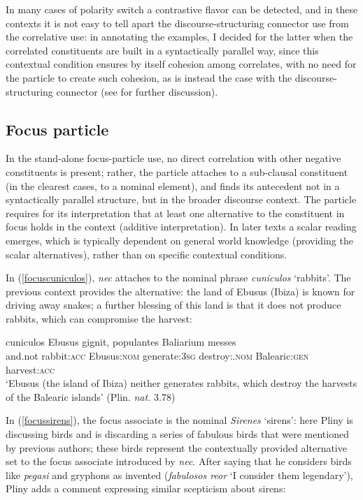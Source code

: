 \documentclass[output=paper,modfonts,nonflat,citecolor=brown,
showindex
]{langsci/langscibook}
\begin{document}
In many cases of polarity switch a contrastive flavor can be detected, and in these contexts it is not easy to tell apart the discourse-structuring connector use from the correlative use: in annotating the examples, I decided for the latter when the correlated constituents are built in a syntactically parallel way, since this contextual condition ensures by itself cohesion among correlates, with no need for the particle to create such cohesion, as is instead the case with the discourse-structuring connector (see \citealt[]{OrlandiniPoccetti07} for further discussion).

\subsection{Focus particle} \label{functionfocusparticle}

In the stand-alone focus-particle use, no direct correlation with other negative constituents is present; rather, the particle attaches to a sub-clausal constituent (in the clearest cases, to a nominal element), and finds its antecedent not in a syntactically parallel structure, but in the broader discourse context. The particle requires for its interpretation that at least one alternative to the constituent in focus holds in the context (additive interpretation). In later texts a scalar reading emerges, which is typically dependent on general world knowledge (providing the scalar alternatives), rather than on specific contextual conditions.

In (\ref{focuscuniculos}), {\emph{nec}} attaches to the nominal phrase {\emph{cuniculos}} `rabbits'. The previous context provides the alternative: the land of Ebusus (Ibiza) is known for driving away snakes; a further blessing of this land is that it does not produce rabbits, which can compromise the harvest:

{\begin{exe}
\ex \label{focuscuniculos}  cuniculos Ebusus gignit, populantes Baliarium messes\\
and.not rabbit:{\textsc{acc}} Ebusus:{\textsc{nom}} generate:{\textsc{3sg}} destroy:{\ptcp}.{\textsc{nom}} Balearic:{\textsc{gen}} harvest:{\textsc{acc}}\\

`Ebusus (the island of Ibiza) neither generates rabbits, which destroy the harvests of the Balearic islands' (Plin. {\emph{nat.}} 3.78)
\end{exe}}

\noindent In (\ref{focussirens}), the focus associate is the nominal {\emph{Sirenes}} `sirens': here Pliny is discussing birds and is discarding a series of fabulous birds that were mentioned by previous authors; these birds represent the contextually provided alternative set to the focus associate introduced by {\emph{nec}}. After saying that he considers birds like {\emph{pegasi}} and gryphons as invented ({\emph{fabulosos reor}} `I consider them legendary'), Pliny adds a comment expressing similar scepticism about sirens:
\end{document}

